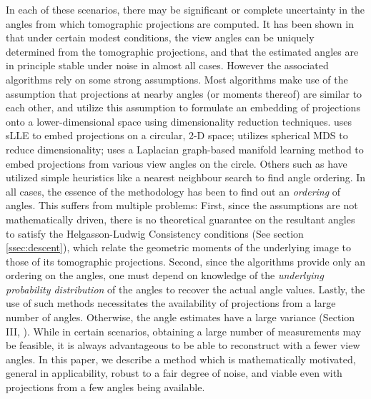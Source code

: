 \documentclass{article}
\begin{document}
In each of these scenarios, there may be significant or complete uncertainty in the angles from which tomographic projections are computed. It has been shown in \cite{uniqueness} that under certain modest conditions, the view angles can be uniquely determined from the tomographic projections, and that the estimated angles are in principle stable under noise \cite{feasibility} in almost all cases. However the associated algorithms rely on some strong assumptions. Most algorithms make use of the assumption that projections at nearby angles (or moments thereof) are similar to each other, and utilize this assumption to formulate an embedding of projections onto a lower-dimensional space using dimensionality reduction techniques. \cite{fangslle} uses sLLE to embed projections on a circular, 2-D space; \cite{fangmds} utilizes spherical MDS to reduce dimensionality; \cite{graphlaplacian} uses a Laplacian graph-based manifold learning method to embed projections from various view angles on the circle. Others such as \cite{feasibility} have utilized simple heuristics like a nearest neighbour search to find angle ordering. In all cases, the essence of the methodology has been to find out an \textit{ordering} of angles. This suffers from multiple problems: First, since the assumptions are not mathematically driven, there is no theoretical guarantee on the resultant angles to satisfy the Helgasson-Ludwig Consistency conditions (See section \ref{ssec:descent}), which relate the geometric moments of the underlying image to those of its tomographic projections. Second, since the algorithms provide only an ordering on the angles, one must depend on knowledge of the \emph{underlying probability distribution} of the angles to recover the actual angle values. Lastly, the use of such methods necessitates the availability of projections from a large number of angles. Otherwise, the angle estimates have a large variance (Section III, \cite{graphlaplacian}). While in certain scenarios, obtaining a large number of measurements may be feasible, it is always advantageous to be able to reconstruct with a fewer view angles.
In this paper, we describe a method which is mathematically motivated, general in applicability, robust to a fair degree of noise, and viable even with projections from a few angles being available.
\end{document}
